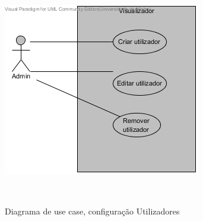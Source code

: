 \begin{figure}[!htb]
	\centering
	\includegraphics[scale=0.80]{images/ucs/ConfUtilizadores}
	\caption {Diagrama de use case, configuração Utilizadores}~\label{fig: confutil}
\end{figure}
\pagebreak

